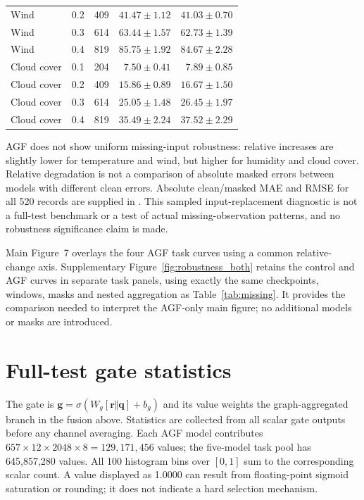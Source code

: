 \documentclass[10pt,a4paper]{article}
\begin{document}
\begin{table}[H]
\begin{tabular}{lrrrr}
Wind & 0.2 & 409 & $41.47 \pm 1.12$ & $41.03 \pm 0.70$ \\

Wind & 0.3 & 614 & $63.44 \pm 1.57$ & $62.73 \pm 1.39$ \\

Wind & 0.4 & 819 & $85.75 \pm 1.92$ & $84.67 \pm 2.28$ \\

Cloud cover & 0.1 & 204 & $7.50 \pm 0.41$ & $7.89 \pm 0.85$ \\

Cloud cover & 0.2 & 409 & $15.86 \pm 0.89$ & $16.67 \pm 1.50$ \\

Cloud cover & 0.3 & 614 & $25.05 \pm 1.48$ & $26.45 \pm 1.97$ \\

Cloud cover & 0.4 & 819 & $35.49 \pm 2.24$ & $37.52 \pm 2.29$ \\

\bottomrule\end{tabular}\end{table}

AGF does not show uniform missing-input robustness: relative increases are slightly lower for temperature and wind, but higher for humidity and cloud cover. Relative degradation is not a comparison of absolute masked errors between models with different clean errors. Absolute clean/masked MAE and RMSE for all 520 records are supplied in . This sampled input-replacement diagnostic is not a full-test benchmark or a test of actual missing-observation patterns, and no robustness significance claim is made.

Main Figure~7 overlays the four AGF task curves using a common relative-change axis. Supplementary Figure~\ref{fig:robustness_both} retains the control and AGF curves in separate task panels, using exactly the same checkpoints, windows, masks and nested aggregation as Table~\ref{tab:missing}. It provides the comparison needed to interpret the AGF-only main figure; no additional models or masks are introduced.

\section{Full-test gate statistics}
The gate is $\mathbf g=\sigma(W_g[\mathbf r\Vert\mathbf q]+b_g)$ and its value weights the graph-aggregated branch in the fusion above. Statistics are collected from all scalar gate outputs before any channel averaging. Each AGF model contributes $657\times12\times2048\times8=129{,}171{,}456$ values; the five-model task pool has 645,857,280 values. All 100 histogram bins over $[0,1]$ sum to the corresponding scalar count. A value displayed as 1.0000 can result from floating-point sigmoid saturation or rounding; it does not indicate a hard selection mechanism.
\end{document}
